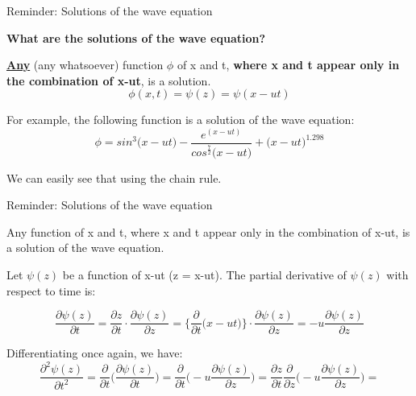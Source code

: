 {\begin{frame}{Reminder: Solutions of the wave equation}
\vspace{0.2cm}

{\bf What are the solutions of the wave equation?}

\vspace{0.2cm}

\underline{\bf Any} (any whatsoever) function $\phi$ of x and t,
{\bf where x and t appear only in the combination of x-ut},
is a solution.
\begin{equation*}
  \phi(x,t) = \psi(z) = \psi(x-ut)
\end{equation*}

\vspace{0.1cm}

For example, the following function is a solution of the wave equation:
\begin{equation*}
  \phi = sin^3\Big( x-ut \Big) - \frac{e^{(x-ut)}}{cos^{\frac{7}{2}}\Big( x-ut\Big)} + \Big( x-ut\Big)^{1.298}
\end{equation*}

\vspace{0.1cm}

We can easily see that using the chain rule.

\end{frame}

%
%
%
%

\begin{frame}{Reminder: Solutions of the wave equation}

Any function of x and t, where x and t appear only in the combination of x-ut,
is a solution of the wave equation.\\

\vspace{0.1cm}

Let $\psi(z)$ be a function of x-ut (z = x-ut).
The partial derivative of  $\psi(z)$ with respect to time is:

\begin{equation*}
  \frac{\partial \psi(z)}{\partial t} =
  \frac{\partial z}{\partial t} \cdot \frac{\partial \psi(z)}{\partial z} =
  \bigg\{ \frac{\partial}{\partial t} \Big( x - ut \Big) \bigg\} \cdot \frac{\partial \psi(z)}{\partial z} =
  -u \frac{\partial \psi(z)}{\partial z}
\end{equation*}

Differentiating once again, we have:
\begin{equation*}
  \frac{\partial^{2} \psi(z)}{\partial t^{2}} =
  \frac{\partial}{\partial t} \Big( \frac{\partial \psi(z)}{\partial t} \Big) =
  \frac{\partial}{\partial t} \Big(  -u \frac{\partial \psi(z)}{\partial z} \Big) =
  \frac{\partial z}{\partial t} \frac{\partial}{\partial z} \Big(  -u \frac{\partial \psi(z)}{\partial z} \Big) =
\end{equation*}


\end{frame}}

